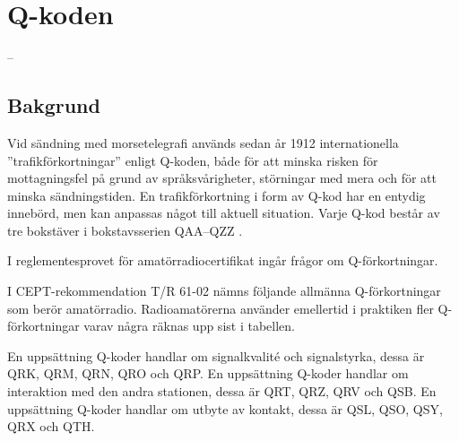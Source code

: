 \section{Q-koden}
\label{q-koden}
 --

\subsection{Bakgrund}

Vid sändning med morsetelegrafi används sedan år 1912 internationella
''trafikförkortningar'' enligt Q-koden, både för att minska risken för
mottagningsfel på grund av språksvårigheter, störningar med mera och för
att minska sändningstiden.
En trafikförkortning i form av Q-kod har en entydig innebörd, men kan anpassas
något till aktuell situation.
Varje Q-kod består av tre bokstäver i bokstavsserien QAA--QZZ
\cite[M.1172]{ITU-RR}.

I reglementesprovet för amatörradiocertifikat ingår frågor om Q-förkortningar.

I CEPT-rekommendation T/R 61-02 \cite[Annex 6]{TR6102} nämns följande allmänna
Q-förkortningar som berör amatörradio.
Radioamatörerna använder emellertid i praktiken fler Q-förkortningar varav
några räknas upp sist i tabellen.

En uppsättning Q-koder handlar om signalkvalité och signalstyrka, dessa är
QRK, QRM, QRN, QRO och QRP.
En uppsättning Q-koder handlar om interaktion med den andra stationen,
dessa är QRT, QRZ, QRV och QSB.
En uppsättning Q-koder handlar om utbyte av kontakt, dessa är QSL, QSO,
QSY, QRX och QTH.

